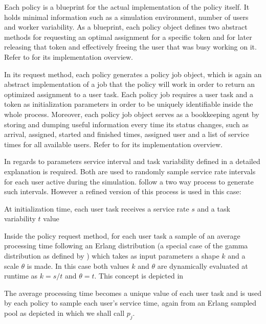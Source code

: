 
Each policy is a blueprint for the actual implementation of the policy itself. It holds minimal information such as a simulation environment, number of users and worker variability. As a blueprint, each policy object defines two abstract methods for requesting an optimal assignment for a specific token and for later releasing that token and effectively freeing the user that was busy working on it. Refer to  for its implementation overview.


In its request method, each policy generates a policy job object, which is again an abstract implementation of a job that the policy will work in order to return an optimized assignment to a user task. Each policy job requires a user task and a token as initialization parameters in order to be uniquely identifiable inside the whole process. Moreover, each policy job object serves as a bookkeeping agent by storing and dumping useful information every time its status changes, such as arrival, assigned, started and finished times, assigned user and a list of service times for all available users. Refer to  for its implementation overview.


In regards to parameters service interval and task variability defined in  a detailed explanation is required. Both are used to randomly sample service rate intervals for each user active during the simulation. \citet[p. 8]{Zeng2005} follow a two way process to generate such intervals. However a refined version of this process is used in this case:
\begin{enumerate*}
	\item At initialization time, each user task receives a service rate $s$ and a task variability $t$ value
	\item Inside the policy request method, for each user task a sample of an average processing time following an Erlang distribution (a special case of the gamma distribution as defined by \citet{Adan2015}) which takes as input parameters a shape $k$ and a scale $\theta$ is made. In this case both values $k$ and $\theta$ are dynamically evaluated at runtime as $k=s/t$ and $\theta = t$. This concept is depicted in 
	\item The average processing time becomes a unique value of each user task and is used by each policy to sample each user's service time, again from an Erlang sampled pool as depicted in  which we shall call $p_j$.
\end{enumerate*}

